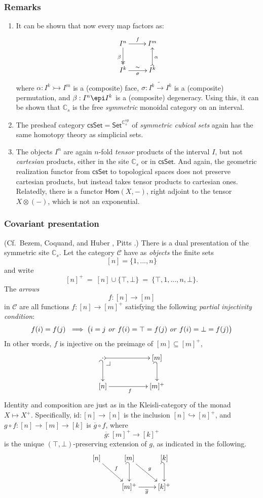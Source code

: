 \documentclass[11pt]{article}
\makeatletter
\newcommand{\C}{\ensuremath{\mathbb{C}}}
\newcommand{\psh}[1]{\ensuremath{\mathsf{Set}^{#1^{\mathrm{op}}}}}
\newcommand{\pbcorner}[1][dr]{\save*!/#1-1.2pc/#1:(-1,1)@^{|-}\restore}
\newcommand{\hook}{\ensuremath{\hookrightarrow}}
\theoremstyle{remark}
\theoremstyle{definition}
\makeatother
\begin{document}
\subsubsection*{Remarks}
\begin{enumerate}
\item It can be shown that now every map factors as:
\[
\xymatrix{
 I^n \ar[r]^{f} \ar@{->>}[d]_{\beta} & I^m\\
I^k \ar[r]^{\sim}_{\sigma} & I^k \ar@{>->}[u]_{\alpha}
}
\]
where $\alpha : I^k \rightarrowtail I^m$ is a (composite) face, $\sigma : I^k \tilde{\to} I^k$ is a (composite) permutation, and $\beta : I^n \epi I^k$ is a (composite) degeneracy.  Using this, it can be shown that $\mathbb{C}_s$ is the free \emph{symmetric} monoidal category on an interval.

\item The presheaf category $\mathsf{csSet} = \psh{\C_s}$ of \emph{symmetric cubical sets} again has the same homotopy theory as simplicial sets.

\item The objects $I^n$ are again  $n$-fold \emph{tensor} products of the interval $I$, but not  \emph{cartesian} products, either in the site $\C_s$ or in  $\mathsf{csSet}$.   And again, the geometric realization functor from $\mathsf{csSet}$ to topological spaces does not preserve cartesian products, but instead takes tensor products to cartesian ones. Relatedly, there is a functor $\mathsf{Hom}(X, - )$, right adjoint to the tensor $X\otimes (-)$, which is not an exponential.
\end{enumerate}

\subsubsection{Covariant presentation}

(Cf.\ Bezem, Coquand, and Huber \cite{BCH}, Pitts \cite{Pitts}.) There is a dual presentation of the symmetric site $\C_s$.  Let the category $\mathcal{C}$ have as \emph{objects} the finite sets $$[n]= \{1, ..., n\}$$ and write 
\[
[n]^+\ =\  [n] \cup \{\top, \bot\}\ =\ \{\top, 1, ..., n, \bot\}.
\]
The \emph{arrows}
\[
f : [n] \to [m]
\]
in $\mathcal{C}$ are all functions  $f : [n] \to [m]^+$ satisfying the following \emph{partial injectivity condition}:
\[
f(i)= f(j)\ \implies \big(i = j\ \text{\emph{or}}\ f(i) = \top = f(j)\ \text{\emph{or}}\  f(i) = \bot = f(j) \big)
\]
In other words, $f$ is injective on the preimage of  $[m] \subseteq [m]^+$,
\[
\xymatrix{
\cdot \ar@{_{(}->}[d] \ar@{>->}[rr] \pbcorner && [m] \ar@{_{(}->}[d] \\
[n] \ar[rr]_{f} && [m]^+
}
\]
Identity and composition are just as in the Kleisli-category of the monad $X\mapsto X^+$.  Specifically, $\mathrm{id}: [n] \to [n]$ is the inclusion $[n] \hook [n]^+$, and $g\circ f : [n] \to [m] \to [k]$ is $\overline{g}\circ f$, where $$\overline{g}:[m]^+\to[k]^+$$ is the unique $(\top, \bot)$-preserving extension of $g$, as indicated in the following.
\[
\xymatrix{
[n] \ar[rd]^{f} & [m] \ar@{_{(}->}[d] \ar[rd]^{g} & [k] \ar@{_{(}->}[d] \\
		& [m]^+\ar[r]_{\overline{g}} & [k]^+
}
\]
\end{document}
